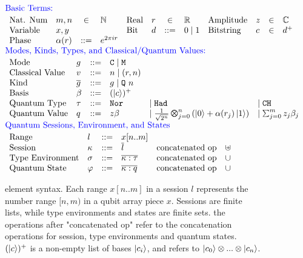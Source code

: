 \begin{figure}[t]
{
  \small
\[\hspace*{-0.5em}
\begin{array}{l}
\textcolor{blue}{\text{Basic Terms:}}\\[0.2em]
\begin{array}{llcl llcl llcl}
\text{Nat. Num} & m, n & \in & \mathbb{N}
&
      \text{Real} & r & \in & \mathbb{R}
&
      \text{Amplitude} & z & \in & \mathbb{C}
\\
      \text{Variable} & x,y &&

 & \text{Bit} & d & ::= & 0\mid 1       
&
      \text{Bitstring} & c & \in & d^{+}      
\\
\text{Phase} & \alpha(r) & ::= & e^{2\pi i r}
\\
\end{array}
\\[1em]
\textcolor{blue}{\text{Modes, Kinds, Types, and Classical/Quantum Values:}}\\[0.2em]
\begin{array}{llclll} 
      \text{Mode} & g & ::= & \cmode  \mid \mmode\\
      \text{Classical Value} & v & ::= & n \mid (r,n)\\
      \text{Kind} & \overline{g} & ::= & g \mid \qmode{n} \\
      \text{Basis}& \beta & ::= & (\ket{c})^+\\
      \text{Quantum Type} & \tau & ::= & \tnort &\mid \thadt & \mid \tcht \\
      \text{Quantum Value} & q & ::= & z\beta & \mid \shad{2^n}{n}{\alpha(r_j)} &\mid \ssum{j=0}{m}{z_j\beta_j} \\
    \end{array}
\\[1em]
\textcolor{blue}{\text{Quantum Sessions, Environment, and States}}\\[0.2em]
\begin{array}{llclcl} 
      \text{Range} & l & ::= & x[n..m] \\
      \text{Session} & \kappa & ::= & \overline{l} & \text{concatenated op} & \uplus \\
      \text{Type Environment} & \sigma & ::= & \overline{\kappa : \tau } & \text{concatenated op} & \cup \\
      \text{Quantum State} & \varphi & ::= & \overline{ \kappa : q } & \text{concatenated op} & \cup \\
    \end{array}
\end{array}
  \]
}
  \caption{\qafny element syntax. Each range $x[n..m]$ in a session $l$ represents the number range $[n,m)$ in a qubit array piece $x$. Sessions are finite lists, while type environments and states are finite sets. the operations after "concatenated op" refer to the concatenation operations for session, type environments and quantum states. $(\left\vert{c}\right\rangle)^+$ is a non-empty list of bases $\left\vert{c_i}\right\rangle$, and refers to $\left\vert{c_0}\right\rangle\otimes ... \otimes \left\vert{c_n}\right\rangle$. }
  \label{fig:qafny-state}
\end{figure}

